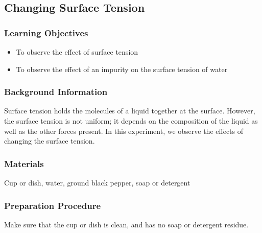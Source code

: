 \subsection{Changing Surface Tension}

\subsubsection*{Learning Objectives}
\begin{itemize}
\item{To observe the effect of surface tension}
\item{To observe the effect of an impurity on the surface tension of water}
\end{itemize}

\subsubsection*{Background Information}
Surface tension holds the molecules of a liquid together at the surface. However, the surface tension is not uniform; it depends on the composition of the liquid as well as the other forces present. In this experiment, we observe the effects of changing the surface tension.

\subsubsection*{Materials}
Cup or dish, water, ground black pepper, soap or detergent

\subsubsection*{Preparation Procedure}
Make sure that the cup or dish is clean, and has no soap or detergent residue.


